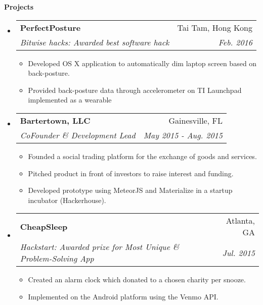 \documentclass[letterpaper,10pt]{article}
\makeatletter
\newcommand{\resitem}[1]{\item #1 \vspace{-2pt}}
\newcommand{\resheading}[1]{{\large \colorbox{mygrey}{\begin{minipage}{\textwidth}{\textbf{#1 \vphantom{p\^{E}}}}\end{minipage}}}}
\newcommand{\ressubheading}[4]{
\begin{tabular*}{7.0in}{l@{\extracolsep{\fill}}r}
		\textbf{#1} & #2 \\
		\textit{#3} & \textit{#4} \\
\end{tabular*}\vspace{-6pt}}
\makeatother
\begin{document}
\resheading{Projects}
\begin{itemize}
\item
	\ressubheading{PerfectPosture}{Tai Tam, Hong Kong}{Bitwise hacks: Awarded best software hack}{Feb. 2016}
	\begin{itemize}
		\resitem{Developed OS X application to automatically dim laptop screen based on back-posture.}
		\resitem{Provided back-posture data through accelerometer on TI Launchpad implemented as a wearable}
	\end{itemize}
\item
	\ressubheading{Bartertown, LLC}{Gainesville, FL}{CoFounder \& Development Lead}{May 2015 - Aug. 2015}
	\begin{itemize}
		\resitem{Founded a social trading platform for the exchange of goods and services.}
		\resitem{Pitched product in front of investors to raise interest and funding.}
		\resitem{Developed prototype using MeteorJS and Materialize in a startup incubator (Hackerhouse).}
	\end{itemize}
\item
	\ressubheading{CheapSleep}{Atlanta, GA}{Hackstart: Awarded prize for Most Unique \& Problem-Solving App}{Jul. 2015}
	\begin{itemize}
		\resitem{Created an alarm clock which donated to a chosen charity per snooze.}
		\resitem{Implemented on the Android platform using the Venmo API.}
	\end{itemize}

\end{itemize}
\end{document}

